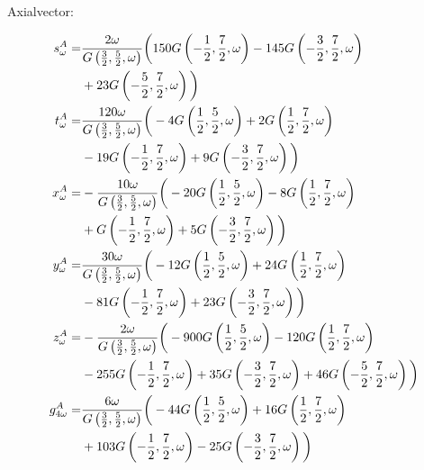 \documentclass[aps,prc,superscriptaddress,showpacs,floatfix, nofootinbib,preprintnumbers,twocolumn]{revtex4}
\begin{document}
Axialvector:
\begin{scriptsize}
\begin{align}
s^A_{\omega }=&\frac{2 \omega  }{G\left(\frac{3}{2},\frac{5}{2},\omega \right)}\bigg{(}150 G\left(-\frac{1}{2},\frac{7}{2},\omega \right)-145 G\left(-\frac{3}{2},\frac{7}{2},\omega \right)\nonumber\\
&+23 G\left(-\frac{5}{2},\frac{7}{2},\omega \right)\bigg{)}\\
t^A_{\omega }=&\frac{120 \omega  }{G\left(\frac{3}{2},\frac{5}{2},\omega \right)}\bigg{(}-4 G\left(\frac{1}{2},\frac{5}{2},\omega \right)+2 G\left(\frac{1}{2},\frac{7}{2},\omega \right)\nonumber\\
&-19 G\left(-\frac{1}{2},\frac{7}{2},\omega \right)+9 G\left(-\frac{3}{2},\frac{7}{2},\omega \right)\bigg{)}\\
x^A_{\omega }=&-\frac{10 \omega  }{G\left(\frac{3}{2},\frac{5}{2},\omega \right)}\bigg{(}-20 G\left(\frac{1}{2},\frac{5}{2},\omega \right)-8 G\left(\frac{1}{2},\frac{7}{2},\omega \right)\nonumber\\
&+G\left(-\frac{1}{2},\frac{7}{2},\omega \right)+5 G\left(-\frac{3}{2},\frac{7}{2},\omega \right)\bigg{)}\\
y^A_{\omega }=&\frac{30 \omega  }{G\left(\frac{3}{2},\frac{5}{2},\omega \right)}\bigg{(}-12 G\left(\frac{1}{2},\frac{5}{2},\omega \right)+24 G\left(\frac{1}{2},\frac{7}{2},\omega \right)\nonumber\\
&-81 G\left(-\frac{1}{2},\frac{7}{2},\omega \right)+23 G\left(-\frac{3}{2},\frac{7}{2},\omega \right)\bigg{)}\\
z^A_{\omega }=&-\frac{2 \omega  }{G\left(\frac{3}{2},\frac{5}{2},\omega \right)}\bigg{(}-900 G\left(\frac{1}{2},\frac{5}{2},\omega \right)-120 G\left(\frac{1}{2},\frac{7}{2},\omega \right)\nonumber\\
&-255 G\left(-\frac{1}{2},\frac{7}{2},\omega \right)+35 G\left(-\frac{3}{2},\frac{7}{2},\omega \right)+46 G\left(-\frac{5}{2},\frac{7}{2},\omega \right)\bigg{)}\\
g^A_{4\omega }=&\frac{6 \omega }{G\left(\frac{3}{2},\frac{5}{2},\omega \right)} \bigg{(}-44 G\left(\frac{1}{2},\frac{5}{2},\omega \right)+16 G\left(\frac{1}{2},\frac{7}{2},\omega \right)\nonumber\\
&+103 G\left(-\frac{1}{2},\frac{7}{2},\omega \right)-25 G\left(-\frac{3}{2},\frac{7}{2},\omega \right)\bigg{)}
\end{align}
\end{scriptsize}
\end{document}
